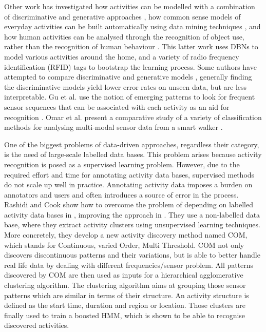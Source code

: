 Other work has investigated how activities can be modelled with a combination of discriminative and generative approaches \cite{Lester2005}, how common sense models of everyday activities can be built automatically using data mining techniques \cite{Pentney2008} \cite{Pentney2007}, and how human activities can be analysed through the recognition of object use, rather than the recognition of human behaviour \cite{Wu2007}. This latter work uses DBNs to model various activities around the home, and a variety of radio frequency identification (RFID) tags to bootstrap the learning process. Some authors have attempted to compare discriminative and generative models \cite{Bao2004} \cite{Ravi2005}, generally finding the discriminative models yield lower error rates on unseen data, but are less interpretable. Gu et al. use the notion of emerging patterns to look for frequent sensor sequences that can be associated with each activity as an aid for recognition \cite{Gu2009}. Omar et al. present a comparative study of a variety of classification methods for analysing multi-modal sensor data from a smart walker \cite{Omar2010}.

One of the biggest problems of data-driven approaches, regardless their category, is the need of large-scale labelled data bases. This problem arises because activity recognition is posed as a supervised learning problem. However, due to the required effort and time for annotating activity data bases, supervised methods do not scale up well in practice. Annotating activity data imposes a burden on annotators and users and often introduces a source of error in the process. Rashidi and Cook show how to overcome the problem of depending on labelled activity data bases in \cite{Rashidi2011}, improving the approach in \cite{Rashidi2013}. They use a non-labelled data base, where they extract activity clusters using unsupervised learning techniques. More concretely, they develop a new activity discovery method named COM, which stands for Continuous, varied Order, Multi Threshold. COM not only discovers discontinuous patterns and their variations, but is able to better handle real life data by dealing with different frequencies/sensor problem. All patterns discovered by COM are then used as inputs for a hierarchical agglomerative clustering algorithm. The clustering algorithm aims at grouping those sensor patterns which are similar in terms of their structure. An activity structure is defined as the start time, duration and region or location. Those clusters are finally used to train a boosted HMM, which is shown to be able to recognise discovered activities. 

